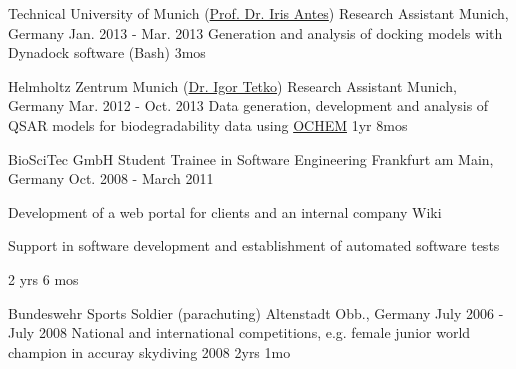 

\begin{cventries}

  \cventrynew
    {Technical University of Munich (\href{mailto:tcb-sekretariat@wzw.tum.de}{Prof. Dr. Iris Antes})} %
    {Research Assistant} %
    {Munich, Germany} %
    {Jan. 2013 - Mar. 2013} %
    {Generation and analysis of docking models with Dynadock software (Bash)}
    {3mos}

  \cventrynew
    {Helmholtz Zentrum Munich (\href{mailto:i.tetko@helmholtz-muenchen.de}{Dr. Igor Tetko})} %
    {Research Assistant} %
    {Munich, Germany} %
    {Mar. 2012 - Oct. 2013} %
    {Data generation, development and analysis of QSAR models for biodegradability data using \href{https://ochem.eu/home/show.do}{OCHEM}}
    {1yr 8mos}


  \cventrynew
  	{BioSciTec GmbH} %
    {Student Trainee in Software Engineering } %
    {Frankfurt am Main, Germany} %
    {Oct. 2008 - March 2011} %
    {
      \begin{cvitems} %
        \item {Development of a web portal for clients and an internal company Wiki}
        \item {Support in software development and establishment of automated software tests}
      \end{cvitems}
    }
    {2 yrs 6 mos}

  \cventrynew
	{Bundeswehr} %
    {Sports Soldier (parachuting)} %
    {Altenstadt Obb., Germany} %
    {July 2006 - July 2008} %
    {National and international competitions, e.g. female junior world champion in accuray skydiving 2008}
    {2yrs 1mo}


\end{cventries}
